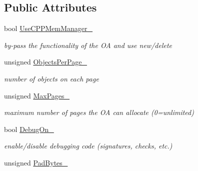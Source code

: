 \subsection*{Public Attributes}
\begin{DoxyCompactItemize}
\item 
\hypertarget{structOAConfig_a864194ead28278f7907d50115c926050}{bool \hyperlink{structOAConfig_a864194ead28278f7907d50115c926050}{Use\-C\-P\-P\-Mem\-Manager\-\_\-}}\label{structOAConfig_a864194ead28278f7907d50115c926050}

\begin{DoxyCompactList}\small\item\em by-\/pass the functionality of the O\-A and use new/delete \end{DoxyCompactList}\item 
\hypertarget{structOAConfig_a22f5e834a557272ed3fdf3c7a77f2073}{unsigned \hyperlink{structOAConfig_a22f5e834a557272ed3fdf3c7a77f2073}{Objects\-Per\-Page\-\_\-}}\label{structOAConfig_a22f5e834a557272ed3fdf3c7a77f2073}

\begin{DoxyCompactList}\small\item\em number of objects on each page \end{DoxyCompactList}\item 
\hypertarget{structOAConfig_a345e27c350d84f467952bca70d3c14c1}{unsigned \hyperlink{structOAConfig_a345e27c350d84f467952bca70d3c14c1}{Max\-Pages\-\_\-}}\label{structOAConfig_a345e27c350d84f467952bca70d3c14c1}

\begin{DoxyCompactList}\small\item\em maximum number of pages the O\-A can allocate (0=unlimited) \end{DoxyCompactList}\item 
\hypertarget{structOAConfig_a0d0250be37964f50c3015b53fa0740d2}{bool \hyperlink{structOAConfig_a0d0250be37964f50c3015b53fa0740d2}{Debug\-On\-\_\-}}\label{structOAConfig_a0d0250be37964f50c3015b53fa0740d2}

\begin{DoxyCompactList}\small\item\em enable/disable debugging code (signatures, checks, etc.) \end{DoxyCompactList}\item 
\hypertarget{structOAConfig_a3b470e4ab11955cbdc2b0c2df5cf19ba}{unsigned \hyperlink{structOAConfig_a3b470e4ab11955cbdc2b0c2df5cf19ba}{Pad\-Bytes\-\_\-}}\label{structOAConfig_a3b470e4ab11955cbdc2b0c2df5cf19ba}


\end{DoxyCompactItemize}
